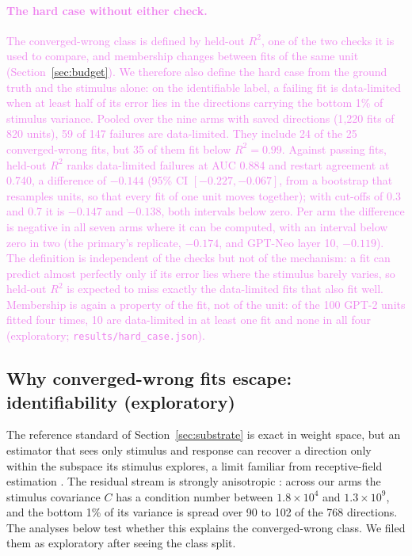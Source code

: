 \documentclass[10pt]{article}
\newcommand{\draft}[1]{\textcolor{violet}{#1}}
\begin{document}
\draft{\paragraph{The hard case without either check.} The converged-wrong class is defined by
held-out $R^2$, one of the two checks it is used to compare, and membership changes between fits
of the same unit (Section~\ref{sec:budget}). We therefore also define the hard case from the
ground truth and the stimulus alone: on the identifiable label, a failing fit is data-limited when
at least half of its error lies in the directions carrying the bottom 1\% of stimulus variance.
Pooled over the nine arms with saved directions (1{,}220 fits of 820 units), 59 of 147 failures
are data-limited. They include 24 of the 25 converged-wrong fits, but 35 of them fit below
$R^2 = 0.99$. Against passing fits, held-out $R^2$ ranks data-limited failures at AUC 0.884 and
restart agreement at 0.740, a difference of $-0.144$ (95\% CI $[-0.227, -0.067]$, from a
bootstrap that resamples units, so that every fit of one unit moves together); with cut-offs of
0.3 and 0.7 it is $-0.147$ and $-0.138$, both intervals below zero. Per arm the difference is
negative in all seven arms where it can be computed, with an interval below zero in two (the
primary's replicate, $-0.174$, and GPT-Neo layer 10, $-0.119$). The definition is independent of
the checks but not of the mechanism: a fit can predict almost perfectly only if its error lies
where the stimulus barely varies, so held-out $R^2$ is expected to miss exactly the data-limited
fits that also fit well. Membership is again a property of the fit, not of the unit: of the 100
GPT-2 units fitted four times, 10 are data-limited in at least one fit and none in all four (exploratory;
\texttt{results/hard\_case.json}).}

\subsection{Why converged-wrong fits escape: identifiability (exploratory)}
\label{sec:identifiability}
The reference standard of Section~\ref{sec:substrate} is exact in weight space, but an estimator
that sees only stimulus and response can recover a direction only within the subspace its
stimulus explores, a limit familiar from receptive-field estimation \citep{theunissen2001strf,
paninski2003convergence,wu2006sysid}. The residual stream is strongly anisotropic
\citep{timkey2021rogue}: across our arms the stimulus covariance $C$ has a condition number
between $1.8\times10^{4}$ and $1.3\times10^{9}$, and the bottom 1\% of its variance is spread over
90 to 102 of the 768 directions. The analyses below test whether this explains the
converged-wrong class. We filed them as exploratory after seeing the class split.
\end{document}
